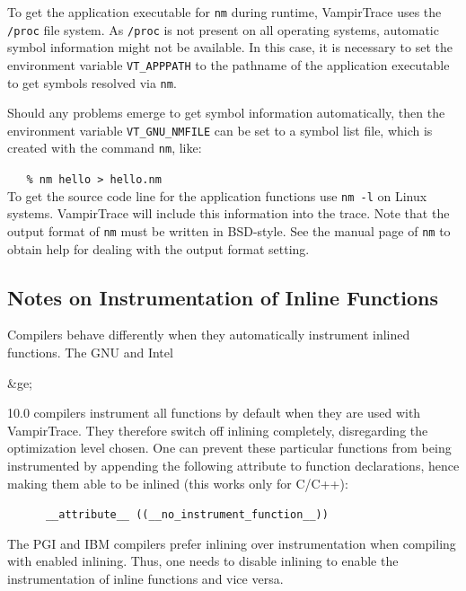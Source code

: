 \documentclass[a4paper,twoside,12pt,BCOR12mm]{scrbook}
\newcommand{\greq}{$\ge$}  %
\renewcommand{\greq}{\begin{rawhtml}&ge;\end{rawhtml}}   %
\begin{document}
To get the application executable for \texttt{nm} during runtime, VampirTrace uses the
\texttt{/proc} file system. As \texttt{/proc} is not present on all operating systems,
automatic symbol information might not be available. In this case, it is necessary to set
the environment variable \texttt{VT\_APPPATH} to the pathname of the application executable
to get symbols resolved via \texttt{nm}.

Should any problems emerge to get symbol information automatically, then the environment
variable \texttt{VT\_GNU\_NMFILE} can be set to a symbol list file, which is created with the
command \texttt{nm}, like:

\vspace{1ex}
\verb|   % nm hello > hello.nm|
\vspace{1ex}\\
To get the source code line for the application functions use \texttt{nm -l} on Linux systems.
VampirTrace will include this information into the trace.
Note that the output format of \texttt{nm} must be written in BSD-style. See the manual page
of \texttt{nm} to obtain help for dealing with the output format setting.

\subsection{Notes on Instrumentation of Inline Functions}
\label{subsec:inlinenotes}
Compilers behave differently when they automatically instrument inlined functions.
The GNU and Intel \greq 10.0 compilers instrument all functions by default when they
are used with VampirTrace. They therefore switch off inlining completely, disregarding
the optimization level chosen.
One can prevent these particular functions from being instrumented by appending the
following attribute to function declarations, hence
making them able to be inlined (this works only for C/C++):

\vspace{1ex}
\verb|      __attribute__ ((__no_instrument_function__))|
\vspace{1ex}

The PGI and IBM compilers prefer inlining over instrumentation when compiling
with enabled inlining. Thus, one needs to disable inlining to enable the instrumentation
of inline functions and vice versa.
\end{document}
